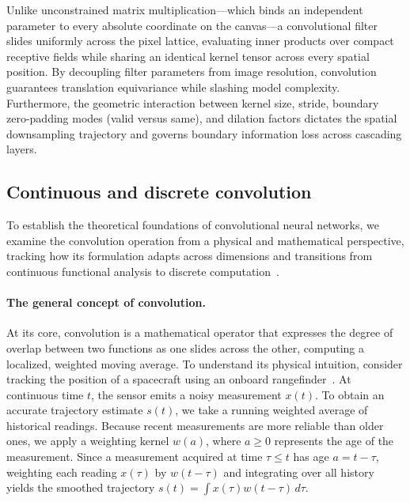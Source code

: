 Unlike unconstrained matrix multiplication---which binds an independent parameter to every absolute coordinate on the canvas---a convolutional filter slides uniformly across the pixel lattice, evaluating inner products over compact receptive fields while sharing an identical kernel tensor across every spatial position. By decoupling filter parameters from image resolution, convolution guarantees translation equivariance while slashing model complexity. Furthermore, the geometric interaction between kernel size, stride, boundary zero-padding modes (valid versus same), and dilation factors dictates the spatial downsampling trajectory and governs boundary information loss across cascading layers.

\subsection{Continuous and discrete convolution}
\label{sec:convolution_mathematical_definition}

To establish the theoretical foundations of convolutional neural networks, we examine the convolution operation from a physical and mathematical perspective, tracking how its formulation adapts across dimensions and transitions from continuous functional analysis to discrete computation~\cite{goodfellow2016deep,bishop2024deep}.

\paragraph{The general concept of convolution.}
At its core, convolution is a mathematical operator that expresses the degree of overlap between two functions as one slides across the other, computing a localized, weighted moving average. To understand its physical intuition, consider tracking the position of a spacecraft using an onboard rangefinder~\cite{goodfellow2016deep}. At continuous time $t$, the sensor emits a noisy measurement $x(t)$. To obtain an accurate trajectory estimate $s(t)$, we take a running weighted average of historical readings. Because recent measurements are more reliable than older ones, we apply a weighting kernel $w(a)$, where $a \ge 0$ represents the age of the measurement. Since a measurement acquired at time $\tau \le t$ has age $a = t - \tau$, weighting each reading $x(\tau)$ by $w(t - \tau)$ and integrating over all history yields the smoothed trajectory $s(t) = \int x(\tau) w(t - \tau) \, d\tau$.

